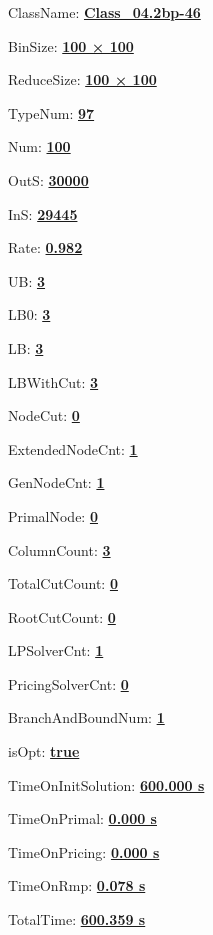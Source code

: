 \documentclass[11pt]{article}
\begin{document}
\pagestyle{empty}


ClassName: \underline{\textbf{Class_04.2bp-46}}
\par
BinSize: \underline{\textbf{100 × 100}}
\par
ReduceSize: \underline{\textbf{100 × 100}}
\par
TypeNum: \underline{\textbf{97}}
\par
Num: \underline{\textbf{100}}
\par
OutS: \underline{\textbf{30000}}
\par
InS: \underline{\textbf{29445}}
\par
Rate: \underline{\textbf{0.982}}
\par
UB: \underline{\textbf{3}}
\par
LB0: \underline{\textbf{3}}
\par
LB: \underline{\textbf{3}}
\par
LBWithCut: \underline{\textbf{3}}
\par
NodeCut: \underline{\textbf{0}}
\par
ExtendedNodeCnt: \underline{\textbf{1}}
\par
GenNodeCnt: \underline{\textbf{1}}
\par
PrimalNode: \underline{\textbf{0}}
\par
ColumnCount: \underline{\textbf{3}}
\par
TotalCutCount: \underline{\textbf{0}}
\par
RootCutCount: \underline{\textbf{0}}
\par
LPSolverCnt: \underline{\textbf{1}}
\par
PricingSolverCnt: \underline{\textbf{0}}
\par
BranchAndBoundNum: \underline{\textbf{1}}
\par
isOpt: \underline{\textbf{true}}
\par
TimeOnInitSolution: \underline{\textbf{600.000 s}}
\par
TimeOnPrimal: \underline{\textbf{0.000 s}}
\par
TimeOnPricing: \underline{\textbf{0.000 s}}
\par
TimeOnRmp: \underline{\textbf{0.078 s}}
\par
TotalTime: \underline{\textbf{600.359 s}}
\par
\newpage
\end{document}
